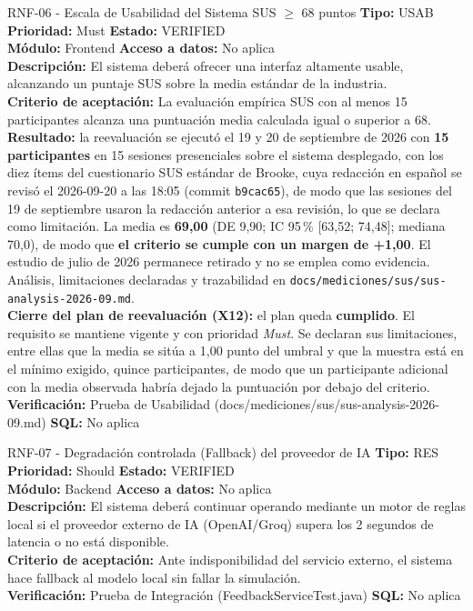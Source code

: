 \documentclass[11pt,a4paper]{article}
\begin{document}
\begin{requisito}{RNF-06 - Escala de Usabilidad del Sistema SUS $\ge$ 68 puntos}
    \textbf{Tipo:} USAB \quad \textbf{Prioridad:} Must \quad \textbf{Estado:} VERIFIED \\[0.2cm]
    \textbf{Módulo:} Frontend \quad \textbf{Acceso a datos:} No aplica \\[0.2cm]
    \textbf{Descripción:} El sistema deberá ofrecer una interfaz altamente usable, alcanzando un puntaje SUS sobre la media estándar de la industria. \\[0.2cm]
    \textbf{Criterio de aceptación:} La evaluación empírica SUS con al menos 15 participantes alcanza una puntuación media calculada igual o superior a 68. \textbf{Resultado:} la reevaluación se ejecutó el 19 y 20 de septiembre de 2026 con \textbf{15 participantes} en 15 sesiones presenciales sobre el sistema desplegado, con los diez ítems del cuestionario SUS estándar de Brooke, cuya redacción en español se revisó el 2026-09-20 a las 18:05 (commit \texttt{b9cac65}), de modo que las sesiones del 19 de septiembre usaron la redacción anterior a esa revisión, lo que se declara como limitación. La media es \textbf{69,00} (DE 9,90; IC 95\,\% [63,52; 74,48]; mediana 70,0), de modo que \textbf{el criterio se cumple con un margen de +1,00}. El estudio de julio de 2026 permanece retirado y no se emplea como evidencia. Análisis, limitaciones declaradas y trazabilidad en \texttt{docs/mediciones/sus/sus-analysis-2026-09.md}. \\[0.2cm]
    \textbf{Cierre del plan de reevaluación (X12):} el plan queda \textbf{cumplido}. El requisito se mantiene vigente y con prioridad \textit{Must}. Se declaran sus limitaciones, entre ellas que la media se sitúa a 1,00 punto del umbral y que la muestra está en el mínimo exigido, quince participantes, de modo que un participante adicional con la media observada habría dejado la puntuación por debajo del criterio. \\[0.2cm]
    \textbf{Verificación:} Prueba de Usabilidad (docs/mediciones/sus/sus-analysis-2026-09.md) \quad \textbf{SQL:} No aplica
\end{requisito}

\begin{requisito}{RNF-07 - Degradación controlada (Fallback) del proveedor de IA}
    \textbf{Tipo:} RES \quad \textbf{Prioridad:} Should \quad \textbf{Estado:} VERIFIED \\[0.2cm]
    \textbf{Módulo:} Backend \quad \textbf{Acceso a datos:} No aplica \\[0.2cm]
    \textbf{Descripción:} El sistema deberá continuar operando mediante un motor de reglas local si el proveedor externo de IA (OpenAI/Groq) supera los 2 segundos de latencia o no está disponible. \\[0.2cm]
    \textbf{Criterio de aceptación:} Ante indisponibilidad del servicio externo, el sistema hace fallback al modelo local sin fallar la simulación. \\[0.2cm]
    \textbf{Verificación:} Prueba de Integración (FeedbackServiceTest.java) \quad \textbf{SQL:} No aplica
\end{requisito}
\end{document}
